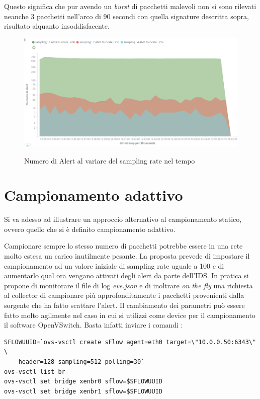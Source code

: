 \documentclass[12pt,a4paper,openright,twoside]{report}
\begin{document}
Questo significa che pur avendo un {\it burst} di pacchetti malevoli non si sono
rilevati neanche 3 pacchetti nell'arco di 90 secondi con quella signature descritta
sopra, risultato alquanto insoddisfacente.

\begin{figure}[h!]
\begin{center}                          %
  \includegraphics[width=\textwidth]{images/CTU-time.png}
  \caption{Numero di Alert al variare del sampling rate nel tempo}\label{ctu:time}
  \label{}
\end{center}
\end{figure}

\clearpage

\section{Campionamento adattivo}

Si va adesso ad illustrare un approccio alternativo al campionamento statico, ovvero
quello che si \`e definito campionamento adattivo.

Campionare sempre lo stesso numero di pacchetti potrebbe essere in una rete molto estesa
un carico inutilmente pesante. La proposta prevede di impostare il campionamento ad un
valore iniziale di sampling rate uguale a 100 e di aumentarlo qual ora vengano attivati
degli alert da parte dell'IDS.
In pratica si propone di monitorare il file di log {\it eve.json} e di inoltrare {\it on the fly}
una richiesta al collector di campionare pi\`u approfonditamente i pacchetti provenienti dalla
sorgente che ha fatto scattare l'alert.
Il cambiamento dei parametri pu\`o essere fatto molto agilmente nel caso in cui si
utilizzi come device per il campionamento il software OpenVSwitch. Basta infatti
inviare i comandi :
\begin{verbatim}
SFLOWUUID=`ovs-vsctl create sFlow agent=eth0 target=\"10.0.0.50:6343\" \
    header=128 sampling=512 polling=30`
ovs-vsctl list br
ovs-vsctl set bridge xenbr0 sflow=$SFLOWUUID
ovs-vsctl set bridge xenbr1 sflow=$SFLOWUUID
\end{verbatim}
\end{document}
